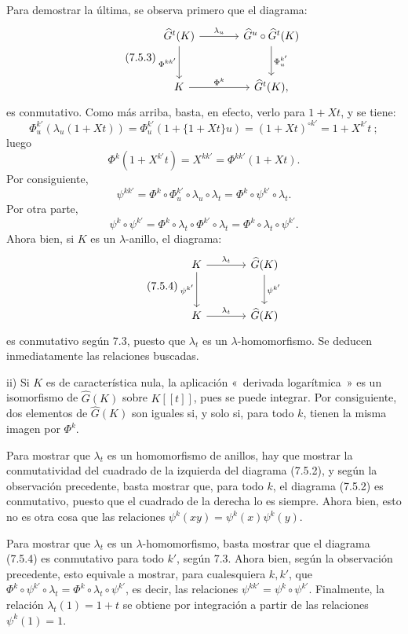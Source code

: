 Para demostrar la última, se observa primero que el diagrama:
\begin{equation}\tag{7.5.3}
\begin{tikzcd}[column sep=large,row sep=large]
\widehat G^t(K) \arrow[r,"\lambda_u"] \arrow[d,"\Phi^{kk'}"'] &
\widehat G^u\circ\widehat G^t(K) \arrow[d,"\Phi^{k'}_u"]\\
K \arrow[r,"\Phi^k"] &
\widehat G^t(K),
\end{tikzcd}
\end{equation}
es conmutativo. Como más arriba, basta, en efecto, verlo para \(1+Xt\), y se tiene:
\[
  \Phi^{k'}_u(\lambda_u(1+Xt))
  =
  \Phi^{k'}_u(1+\{1+Xt\}u)
  =
  (1+Xt)^{\circ k'}
  =
  1+X^{k'}t~;
\]
luego
\[
  \Phi^k(1+X^{k'}t)=X^{kk'}=\Phi^{kk'}(1+Xt).
\]
Por consiguiente,
\[
  \psi^{kk'}
  =
  \Phi^k\circ\Phi^{k'}_u\circ\lambda_u\circ\lambda_t
  =
  \Phi^k\circ\psi^{k'}\circ\lambda_t.
\]
Por otra parte,
\[
  \psi^k\circ\psi^{k'}
  =
  \Phi^k\circ\lambda_t\circ\Phi^{k'}\circ\lambda_t
  =
  \Phi^k\circ\lambda_t\circ\psi^{k'}.
\]
Ahora bien, si \(K\) es un \(\lambda\)-anillo, el diagrama:
\begin{equation}\tag{7.5.4}
\begin{tikzcd}[column sep=large,row sep=large]
K \arrow[r,"\lambda_t"] \arrow[d,"\psi^{k'}"'] &
\widehat G(K) \arrow[d,"\psi^{k'}"]\\
K \arrow[r,"\lambda_t"] &
\widehat G(K)
\end{tikzcd}
\end{equation}
es conmutativo según 7.3, puesto que \(\lambda_t\) es un \(\lambda\)-homomorfismo. Se deducen inmediatamente las relaciones buscadas.

ii) Si \(K\) es de característica nula, la aplicación «~derivada logarítmica~» es un isomorfismo de \(\widehat G(K)\) sobre \(K[[t]]\), pues se puede integrar. Por consiguiente, dos elementos de \(\widehat G(K)\) son iguales si, y solo si, para todo \(k\), tienen la misma imagen por \(\Phi^k\).

Para mostrar que \(\lambda_t\) es un homomorfismo de anillos, hay que mostrar la conmutatividad del cuadrado de la izquierda del diagrama (7.5.2), y según la observación precedente, basta mostrar que, para todo \(k\), el diagrama (7.5.2) es conmutativo, puesto que el cuadrado de la derecha lo es siempre. Ahora bien, esto no es otra cosa que las relaciones \(\psi^k(xy)=\psi^k(x)\psi^k(y)\).

Para mostrar que \(\lambda_t\) es un \(\lambda\)-homomorfismo, basta mostrar que el diagrama (7.5.4) es conmutativo para todo \(k'\), según 7.3. Ahora bien, según la observación precedente, esto equivale a mostrar, para cualesquiera \(k,k'\), que \(\Phi^k\circ\psi^{k'}\circ\lambda_t=\Phi^k\circ\lambda_t\circ\psi^{k'}\), es decir, las relaciones \(\psi^{kk'}=\psi^k\circ\psi^{k'}\). Finalmente, la relación \(\lambda_t(1)=1+t\) se obtiene por integración a partir de las relaciones \(\psi^k(1)=1\).

